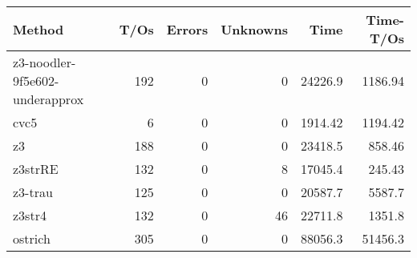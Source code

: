 \begin{tabular}{lrrrrr}
\hline
 Method                         &   T/Os &   Errors &   Unknowns &     Time &   Time-T/Os \\
\hline
 z3-noodler-9f5e602-underapprox &    192 &        0 &          0 & 24226.9  &     1186.94 \\
 cvc5                           &      6 &        0 &          0 &  1914.42 &     1194.42 \\
 z3                             &    188 &        0 &          0 & 23418.5  &      858.46 \\
 z3strRE                        &    132 &        0 &          8 & 17045.4  &      245.43 \\
 z3-trau                        &    125 &        0 &          0 & 20587.7  &     5587.7  \\
 z3str4                         &    132 &        0 &         46 & 22711.8  &     1351.8  \\
 ostrich                        &    305 &        0 &          0 & 88056.3  &    51456.3  \\
\hline
\end{tabular}
